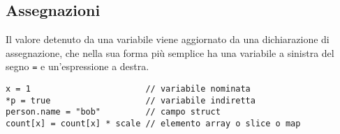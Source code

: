 \documentclass[../../thesis.tex]{subfiles}
\begin{document}
    \subsection{Assegnazioni}\label{subsec:assegnazioni}
    Il valore detenuto da una variabile viene aggiornato da una dichiarazione di assegnazione, che nella sua forma più semplice ha una variabile a sinistra del segno \verb"=" e un'espressione a destra.
    \begin{lstlisting}[frame = single, label = {lst:lstlisting1-4.1}]
x = 1                       // variabile nominata
*p = true                   // variabile indiretta
person.name = "bob"         // campo struct
count[x] = count[x] * scale // elemento array o slice o map
    \end{lstlisting}
    
    
\end{document}
